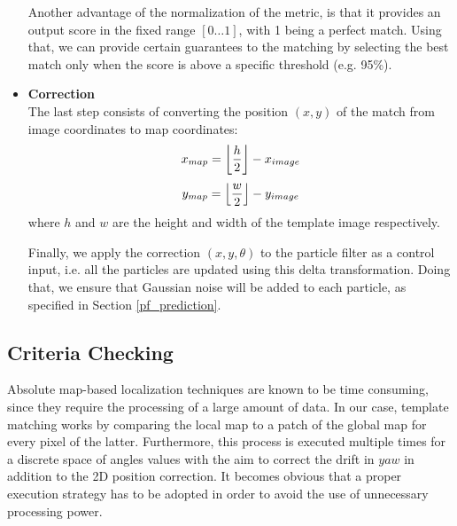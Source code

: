 \begin{itemize}
        Another advantage of the normalization of the metric, is that it
        provides an output score in the fixed range $[0 \dots 1]$, with
        1 being a perfect match. Using that, we can provide certain guarantees
        to the matching by selecting the best match only when the score is
        above a specific threshold (e.g. 95\%).


    \item \textbf{Correction} \\
        The last step consists of converting the position $(x, y)$ of the match
        from image coordinates to map coordinates:
        \begin{equation}
            x_{map} = \floor*{\frac{h}{2}} - x_{image}
        \end{equation}
        \begin{equation}
            y_{map} = \floor*{\frac{w}{2}} - y_{image}
        \end{equation}
        where $h$ and $w$ are the height and width of the template image
        respectively.

        Finally, we apply the correction $(x, y, \theta)$ to the particle
        filter as a control input, i.e. all the particles are updated using
        this delta transformation. Doing that, we ensure that Gaussian
        noise will be added to each particle, as specified in Section
        \ref{pf_prediction}.
\end{itemize}

\subsection{Criteria Checking}

Absolute map-based localization techniques are known to be time consuming,
since they require the processing of a large amount of data.
In our case, template matching works by comparing the local map
to a patch of the global map for every pixel of the latter.
Furthermore, this process is executed multiple times for a discrete space
of angles values with the aim to correct the drift in $yaw$ in addition to
the 2D position correction.
It becomes obvious that a proper execution strategy has to be
adopted in order to avoid the use of unnecessary processing power.

